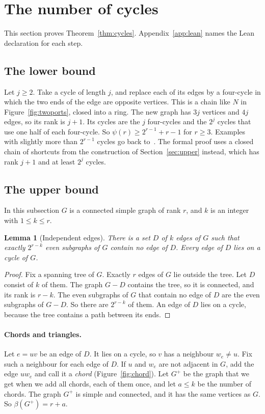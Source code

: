 \documentclass[11pt]{article}
\newtheorem{lemma}[theorem]{Lemma}
\theoremstyle{definition}
\theoremstyle{remark}
\numberwithin{equation}{section}
\begin{document}
\section{The number of cycles}\label{sec:cycles}

This section proves Theorem~\ref{thm:cycles}. Appendix~\ref{app:lean} names the Lean declaration for
each step.

\subsection{The lower bound}

Let $j\ge2$. Take a cycle of length $j$, and replace each of its edges by a four-cycle in which the
two ends of the edge are opposite vertices. This is a chain like $N$ in Figure~\ref{fig:twoports},
closed into a ring. The new graph has $3j$ vertices and $4j$ edges, so its rank is $j+1$. Its cycles
are the $j$ four-cycles and the $2^{j}$ cycles that use one half of each four-cycle. So
$\psi(r)\ge2^{r-1}+r-1$ for $r\ge3$. Examples with slightly more than $2^{r-1}$ cycles go back to~\cite{ES}. The formal proof
uses a closed chain of shortcuts from the construction of Section~\ref{sec:upper} instead, which has
rank $j+1$ and at least $2^{j}$ cycles.

\subsection{The upper bound}

In this subsection $G$ is a connected simple graph of rank $r$, and $k$ is an integer with
$1\le k\le r$.

\begin{lemma}[Independent edges]\label{lem:indep}
There is a set $D$ of $k$ edges of $G$ such that exactly $2^{r-k}$ even subgraphs of $G$ contain no
edge of $D$. Every edge of $D$ lies on a cycle of $G$.
\end{lemma}

\begin{proof}
Fix a spanning tree of $G$. Exactly $r$ edges of $G$ lie outside the tree. Let $D$ consist of $k$
of them. The graph $G-D$ contains the tree, so it is connected, and its rank is $r-k$. The even
subgraphs of $G$ that contain no edge of $D$ are the even subgraphs of $G-D$. So there are
$2^{r-k}$ of them. An edge of $D$ lies on a cycle, because the tree contains a path between its
ends.
\end{proof}

\paragraph{Chords and triangles.}
Let $e=uv$ be an edge of $D$. It lies on a cycle, so $v$ has a neighbour $w_e\ne u$. Fix such a
neighbour for each edge of $D$. If $u$ and $w_e$ are not adjacent in $G$, add the edge $uw_e$ and
call it a \emph{chord} (Figure~\ref{fig:chord}). Let $G^{+}$ be the graph that we get when we add
all chords, each of them once, and let $a\le k$ be the number of chords. The graph $G^{+}$ is simple
and connected, and it has the same vertices as $G$. So $\beta(G^{+})=r+a$.
\end{document}
